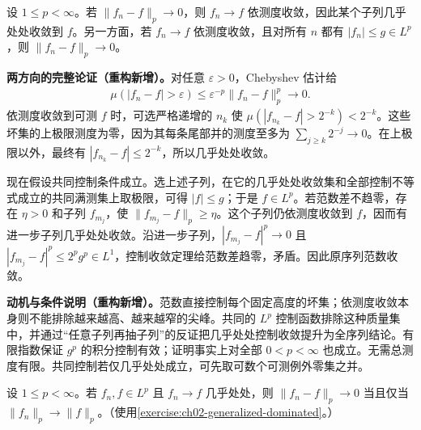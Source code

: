 \documentclass[../../main.tex]{subfiles}
\begin{document}
\begin{exercise}\label{exercise:ch06-norm-measure-convergence}
设 $1\leqslant p<\infty$。若 $\|f_n-f\|_p\to0$，则 $f_n\to f$ 依测度收敛，因此某个子列几乎处处收敛到 $f$。另一方面，若 $f_n\to f$ 依测度收敛，且对所有 $n$ 都有 $|f_n|\leqslant g\in L^p$，则 $\|f_n-f\|_p\to0$。
\end{exercise}
\begin{solution}
\textbf{两方向的完整论证（重构新增）。}对任意 $\varepsilon>0$，Chebyshev 估计给
\begin{align*}
\mu(|f_n-f|>\varepsilon)\leqslant\varepsilon^{-p}\|f_n-f\|_p^p\longrightarrow0.
\end{align*}
依测度收敛到可测 $f$ 时，可选严格递增的 $n_k$ 使 $\mu(|f_{n_k}-f|>2^{-k})<2^{-k}$。这些坏集的上极限测度为零，因为其每条尾部并的测度至多为 $\sum_{j\geqslant k}2^{-j}\to0$。在上极限以外，最终有 $|f_{n_k}-f|\leqslant2^{-k}$，所以几乎处处收敛。

现在假设共同控制条件成立。选上述子列，在它的几乎处处收敛集和全部控制不等式成立的共同满测集上取极限，可得 $|f|\leqslant g$；于是 $f\in L^p$。若范数差不趋零，存在 $\eta>0$ 和子列 $f_{m_j}$，使 $\|f_{m_j}-f\|_p\geqslant\eta$。这个子列仍依测度收敛到 $f$，因而有进一步子列几乎处处收敛。沿进一步子列，$|f_{m_j}-f|^p\to0$ 且 $|f_{m_j}-f|^p\leqslant2^pg^p\in L^1$，控制收敛定理给范数差趋零，矛盾。因此原序列范数收敛。
\end{solution}
\begin{remark}
\textbf{动机与条件说明（重构新增）。}范数直接控制每个固定高度的坏集；依测度收敛本身则不能排除越来越高、越来越窄的尖峰。共同的 $L^p$ 控制函数排除这种质量集中，并通过“任意子列再抽子列”的反证把几乎处处控制收敛提升为全序列结论。有限指数保证 $g^p$ 的积分控制有效；证明事实上对全部 $0<p<\infty$ 也成立。无需总测度有限。共同控制若仅几乎处处成立，可先取可数个可测例外零集之并。
\end{remark}
\begin{exercise}\label{exercise:ch06-ae-norm-convergence}
设 $1\leqslant p<\infty$。若 $f_n,f\in L^p$ 且 $f_n\to f$ 几乎处处，则 $\|f_n-f\|_p\to0$ 当且仅当 $\|f_n\|_p\to\|f\|_p$。（使用\cref{exercise:ch02-generalized-dominated}。）
\end{exercise}
\end{document}
